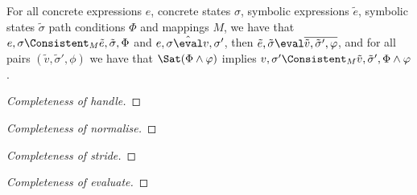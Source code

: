 \begin{lemma}
  \label{lem:completeEval}
  For all concrete expressions $e$, concrete states $\sigma$, symbolic expressions $\tilde{e}$, symbolic states $\tilde{\sigma}$ path conditions $\Phi$ and mappings $M$,
  we have that $e,\sigma\Consistent_{M}\tilde{e},\tilde{\sigma},\Phi$
  and $e,\sigma\hat{\eval} v,\sigma'$,
  then $\tilde{e},\tilde{\sigma}\eval\overline{\tilde{v},\tilde{\sigma}',\phi}$,
  and for all pairs $(\tilde{v},\tilde{\sigma}',\phi)$ we have that $\Sat(\Phi\land\phi)$ implies $v,\sigma'\Consistent_{M}\tilde{v},\tilde{\sigma}',\Phi\land\phi$.
\end{lemma}

\begin{proof}[Completeness of handle]

\end{proof}

\begin{proof}[Completeness of normalise]

\end{proof}

\begin{proof}[Completeness of stride]

\end{proof}

\begin{proof}[Completeness of evaluate]

\end{proof}
